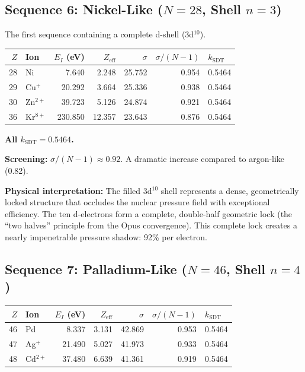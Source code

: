 \subsection{Sequence 6: Nickel-Like ($N = 28$, Shell $n = 3$)}

The first sequence containing a complete d-shell (3d$^{10}$).

\begin{center}
\begin{tabular}{rlrrrrl}
\hline
$Z$ & Ion & $E_I$ (eV) & $Z_{\text{eff}}$ & $\sigma$ & $\sigma/(N{-}1)$ & $k_{\text{SDT}}$ \\
\hline
28 & Ni          &    7.640 &  2.248 & 25.752 & 0.954 & 0.5464 \\
29 & Cu$^+$      &   20.292 &  3.664 & 25.336 & 0.938 & 0.5464 \\
30 & Zn$^{2+}$   &   39.723 &  5.126 & 24.874 & 0.921 & 0.5464 \\
36 & Kr$^{8+}$   &  230.850 & 12.357 & 23.643 & 0.876 & 0.5464 \\
\hline
\end{tabular}
\end{center}

\textbf{All $k_{\text{SDT}} = 0.5464$.}

\textbf{Screening:} $\sigma/(N{-}1) \approx 0.92$.  A dramatic increase compared to argon-like (0.82).

\textbf{Physical interpretation:} The filled 3d$^{10}$ shell represents a dense, geometrically locked structure that occludes the nuclear pressure field with exceptional efficiency.  The ten d-electrons form a complete, double-half geometric lock (the ``two halves'' principle from the Opus convergence).  This complete lock creates a nearly impenetrable pressure shadow: 92\% per electron.


\subsection{Sequence 7: Palladium-Like ($N = 46$, Shell $n = 4$)}

\begin{center}
\begin{tabular}{rlrrrrl}
\hline
$Z$ & Ion & $E_I$ (eV) & $Z_{\text{eff}}$ & $\sigma$ & $\sigma/(N{-}1)$ & $k_{\text{SDT}}$ \\
\hline
46 & Pd          &    8.337 &  3.131 & 42.869 & 0.953 & 0.5464 \\
47 & Ag$^+$      &   21.490 &  5.027 & 41.973 & 0.933 & 0.5464 \\
48 & Cd$^{2+}$   &   37.480 &  6.639 & 41.361 & 0.919 & 0.5464 \\
\hline
\end{tabular}
\end{center}

